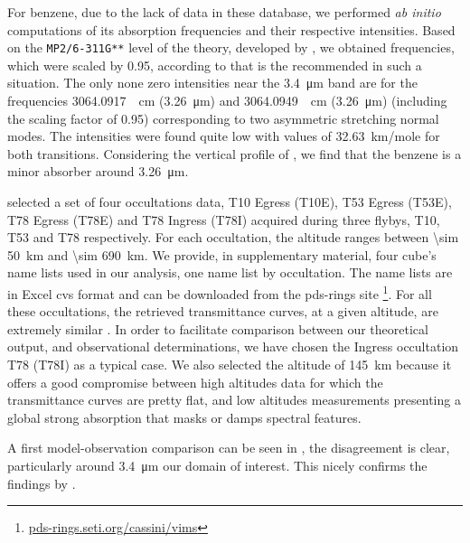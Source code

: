 \documentclass{arxiv-icarus}
\begin{document}
For benzene, due to the lack of data in these database, we performed \emph{ab initio} computations of its absorption frequencies
and their respective intensities. Based on the \texttt{MP2/6-311G**} level of the theory, developed by \cite{Moller1934}, we obtained frequencies, which were scaled by 0.95, according to that is the recommended in such a situation.
The only none zero intensities near the \SI{3.4}{\um} band are for the frequencies \SI{3064.0917}{\per\cm} (\SI{3.26}{\um})
and \SI{3064.0949}{\per\cm} (\SI{3.26}{\um}) (including the scaling factor of 0.95) corresponding to two  asymmetric
stretching normal modes. The intensities were found quite low with values of \SI{32.63}{km/mole} for both transitions.
Considering the vertical profile of , we find that the benzene is a minor absorber around \SI{3.26}{\um}.

\cite{Maltagliati2015} selected a set of four occultations data, T10 Egress (T10E), T53 Egress (T53E), T78 Egress (T78E) and T78 Ingress (T78I) acquired during three flybys, T10, T53 and T78 respectively.
For each occultation, the altitude ranges between \SI{\sim 50}{km} and \SI{\sim 690}{km}.
We provide, in supplementary material, four cube's name lists used in our analysis, one name list by occultation. The name lists are in Excel cvs format and can be downloaded from the pds-rings site \footnote{\href{https://pds-rings.seti.org/cassini/vims/}{pds-rings.seti.org/cassini/vims}}. For all these occultations, the retrieved transmittance curves, at a given altitude, are extremely similar \citep[see for instance Fig. 11 of][]{Maltagliati2015}. In order to facilitate comparison between our theoretical output, and observational determinations, we have chosen the Ingress occultation T78 (T78I) as a typical case. We also selected the altitude of \SI{145}{km} because it offers a good compromise between high altitudes data for which the transmittance curves are pretty flat, and low altitudes measurements presenting a global strong absorption that masks or damps spectral features.

A first model-observation comparison can be seen in , the disagreement is clear, particularly
around \SI{3.4}{\um} our domain of interest. This nicely confirms the findings by \cite{Maltagliati2015}.
\end{document}
